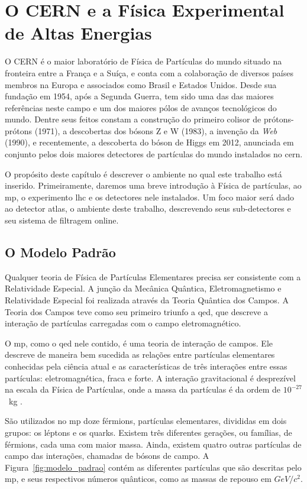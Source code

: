 
\chapter{O CERN e a Física Experimental de Altas Energias}
\label{cap:cern}
\glsresetall

O CERN é o maior laboratório de Física de Partículas do mundo situado na fronteira
entre a França e a Suíça, e conta com a colaboração de diversos países membros na
Europa e associados como Brasil e Estados Unidos. Desde sua fundação em 1954,
após a Segunda Guerra, tem sido uma das das maiores referências neste campo e um
dos maiores pólos de avanços tecnológicos do mundo. Dentre seus feitos constam a 
construção do primeiro colisor de prótons-prótons (1971), a descobertas dos  bósons 
Z e W (1983), a invenção da \emph{Web} (1990), e recentemente, a descoberta 
do bóson de Higgs em 2012, anunciada em conjunto
pelos dois maiores detectores de partículas do mundo instalados no \gls{cern}.

O propósito deste capítulo é descrever o ambiente no qual este trabalho está inserido. 
Primeiramente, daremos uma breve introdução à Física de partículas, ao \gls{mp}, 
o experimento  \gls{lhc} e os detectores nele instalados. Um foco maior será dado
ao detector \gls{atlas}, o ambiente deste trabalho, descrevendo seus sub-detectores
e seu sistema de filtragem online.

\section{O Modelo Padrão}

Qualquer teoria de Física de Partículas Elementares precisa ser consistente com
a Relatividade Especial. A junção da Mecânica Quântica, Eletromagnetismo e
Relatividade Especial foi realizada através da Teoria Quântica
dos Campos. A Teoria dos Campos teve como seu primeiro triunfo a
\gls{qed}, que descreve a interação de partículas carregadas com o campo
eletromagnético. 

O \gls{mp}, como o \gls{qed} nele contido, é uma teoria de interação de campos. 
Ele descreve de maneira bem sucedida as relações entre partículas elementares 
conhecidas pela ciência atual \cite{Intro_Nuclear} e as características de três 
interações entre essas partículas: eletromagnética, fraca e forte. A interação 
gravitacional é desprezível na escala da Física de Partículas, onde a massa da 
partículas é da ordem de $10^{-27}$~kg \cite{Intro_Standard}.

São utilizados no \gls{mp} doze férmions, partículas elementares, divididas em dois 
grupos: os léptons e os quarks. Existem três diferentes gerações, ou famílias, de férmions, 
cada uma com maior massa. Ainda, existem quatro outras partículas de campo das interações, 
chamadas de bósons de campo. A Figura~\ref{fig:modelo_padrao} contém as diferentes 
partículas que são descritas pelo \gls{mp}, e seus respectivos números quânticos, como as 
massas de repouso em $GeV/c^2$.

